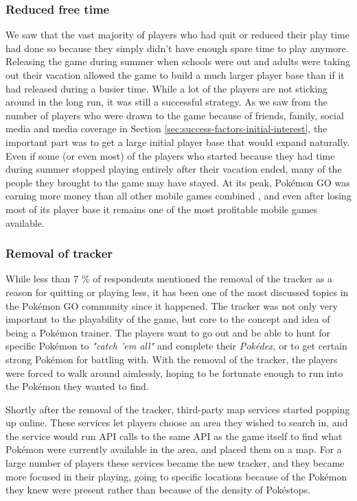 \subsubsection{Reduced free time}
\label{sec:reduced-free-time}
We saw that the vast majority of players who had quit or reduced their play time had done so because they simply didn't have enough spare time to play anymore. Releasing the game during summer when schools were out and adults were taking out their vacation allowed the game to build a much larger player base than if it had released during a busier time. While a lot of the players are not sticking around in the long run, it was still a successful strategy. As we saw from the number of players who were drawn to the game because of friends, family, social media and media coverage in Section \ref{sec:success-factors-initial-interest}, the important part was to get a large initial player base that would expand naturally. Even if some (or even most) of the players who started because they had time during summer stopped playing entirely after their vacation ended, many of the people they brought to the game may have stayed. At its peak, Pokémon GO was earning more money than all other mobile games combined , and even after losing most of its player base it remains one of the most profitable mobile games available.

\subsubsection{Removal of tracker}
While less than 7 \% of respondents mentioned the removal of the tracker as a reason for quitting or playing less, it has been one of the most discussed topics in the Pokémon GO community since it happened. The tracker was not only very important to the playability of the game, but core to the concept and idea of being a Pokémon trainer. The players want to go out and be able to hunt for specific Pokémon to \emph{"catch 'em all"} and complete their \emph{Pokédex}, or to get certain strong Pokémon for battling with. With the removal of the tracker, the players were forced to walk around aimlessly, hoping to be fortunate enough to run into the Pokémon they wanted to find.

Shortly after the removal of the tracker, third-party map services started popping up online. These services let players choose an area they wished to search in, and the service would run API calls to the same API as the game itself to find what Pokémon were currently available in the area, and placed them on a map. For a large number of players these services became the new tracker, and they became more focused in their playing, going to specific locations because of the Pokémon they knew were present rather than because of the density of Pokéstops.

